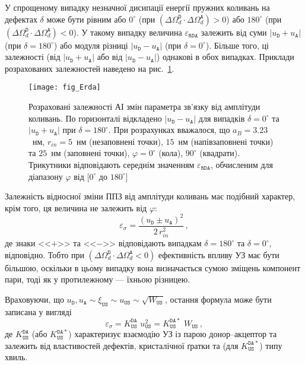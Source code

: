 У спрощеному випадку незначної дисипації енергії пружних коливань на дефектах
$\delta$ може бути рівним або $0^\circ$ (при $(\Delta\Omega_d^\mathtt{D}\cdot\Delta\Omega_d^\mathtt{A})>0$)
або $180^\circ$ (при $(\Delta\Omega_d^\mathtt{D}\cdot\Delta\Omega_d^\mathtt{A})<0$).
У такому випадку величина $\varepsilon_{\mathtt{RDA}}$ залежить
від суми $|u_\mathtt{D}+u_\mathtt{A}|$ (при $\delta=180^\circ$)
або модуля різниці $|u_\mathtt{D}-u_\mathtt{A}|$ (при $\delta=0^\circ$).
Більше того, ці залежності (від $|u_\mathtt{D}+u_\mathtt{A}|$ або від $|u_\mathtt{D}-u_\mathtt{A}|$) однакові в обох випадках.
Приклади розрахованих залежностей наведено на рис.~\ref{fig_Erda}.

\begin{figure}
\center
\texttt{[image: fig\_Erda]}
\caption{\label{fig_Erda}
Розраховані залежності АІ змін параметра зв'язку від амплітуди коливань.
По горизонталі відкладено $|u_\mathtt{D}-u_\mathtt{A}|$ для випадків $\delta=0^\circ$ та
$|u_\mathtt{D}+u_\mathtt{A}|$ при $\delta=180^\circ$.
При розрахунках вважалося, що
$a_B=3.23$~нм,
$r_{in}=5$~нм (незаповнені точки), $15$~нм (напівзаповнені точки) та $25$~нм (заповнені точки),
$\varphi=0^\circ$ (кола), $90^\circ$ (квадрати).
Трикутники відповідають середнім значенням $\varepsilon_{\mathtt{RDA}}$,
обчисленим для діапазону $\varphi$ від $[0^\circ$ до $180^\circ]$
}%
\end{figure}

Залежність відносної зміни ППЗ від амплітуди коливань має подібний характер, крім того,
ця величина не залежить від $\varphi$:
\begin{equation}
\label{eqEpsSig}
\varepsilon_{\sigma}=\frac{(u_\mathtt{D}\pm u_\mathtt{A})^2}{2\,r_{in}^2}\,,
\end{equation}
де
знаки <<$+$>> та <<$-$>> відповідають випадкам $\delta=180^\circ$ та $\delta=0^\circ$, відповідно.
Тобто при $(\Delta\Omega_d^\mathtt{D}\cdot\Delta\Omega_d^\mathtt{A}<0)$ ефективність впливу УЗ має бути більшою,
оскільки в цьому випадку вона визначається сумою зміщень компонент пари,
тоді як у протилежному --- їхньою різницею.


Враховуючи, що $u_\mathtt{D},u_\mathtt{A}\sim \xi_\mathtt{US}\sim u_\mathtt{US}\sim \sqrt{W_\mathtt{US}}$,
остання формула може бути записана у вигляді
\begin{equation}
\label{eqEpsSigUS}
\varepsilon_{\sigma}=K_\mathtt{US}^\mathtt{DA}\,\,u_{\mathtt{US}}^2=K_\mathtt{US}^\mathtt{DA*}\,\,W_{\mathtt{US}}\,,
\end{equation}
де $K_\mathtt{US}^\mathtt{DA}$ (або $K_\mathtt{US}^\mathtt{DA*}$) характеризує взаємодію УЗ із парою донор--акцептор
та залежить від властивостей дефектів, кристалічної ґратки та (для $K_\mathtt{US}^\mathtt{DA*}$) типу хвиль.

